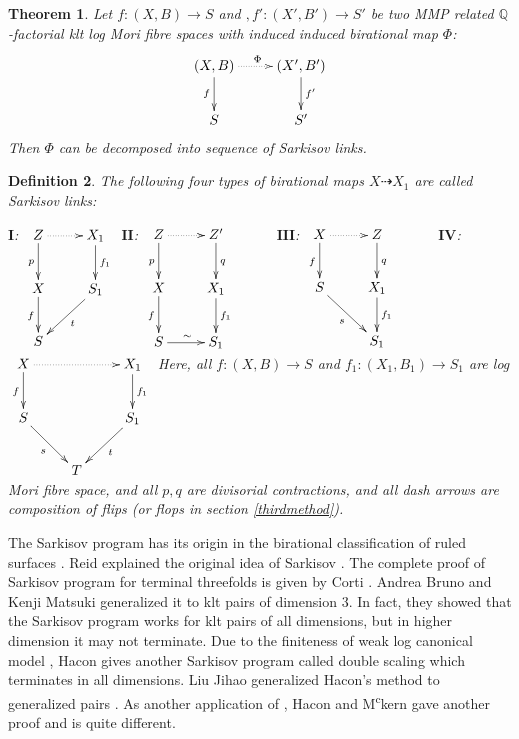 \documentclass{article}
\newtheorem{defn}{Definition}[subsection]
\newtheorem{thm}[defn]{Theorem}
\newtheorem{rmk}[defn]{Remark}
\begin{document}
\begin{thm}\label{main}
  Let $ f:(X,B)\to S$ and $,f':(X',B')\to S' $ be two MMP related $ \mathbb{Q} $-factorial klt log Mori fibre spaces with induced induced  birational map $\Phi$:
  \[ \xymatrix{
    (X,B)\ar[d]_f\ar@{.>}[r]^\Phi&(X',B')\ar[d]^{f'}\\
    S&S'} \]
  Then $ \Phi  $ can be decomposed into sequence of Sarkisov links.
  \end{thm}

\begin{defn}
  The following four types of  birational maps $X\dashrightarrow X_1$ are called Sarkisov links: 

  $\textbf{I}$:
  $\xymatrix{
    Z\ar[d]_p\ar@{.>}[r]&X_1\ar[d]^{f_1}\\
    X\ar[d]_f&S_1\ar[dl]^{t}\\
  S &}$
  $\textbf{II}$:
  $\xymatrix{
    Z\ar[d]_p\ar@{.>}[r]&Z'\ar[d]^{q}&\\
    X\ar[d]_{f}&X_1\ar[d]^{f_1}\\
    S\ar[r]^{\sim}&S_1}$
  $\textbf{III}$:
  $
  \xymatrix{
    X\ar@{.>}[r]\ar[d]_f& Z\ar[d]^q& \\
    S\ar[rd]_{s}         & X_{1}\ar[d]^{f_{1}}&\\
    &S_{1}
  }
  $
  $\textbf{IV}$:
  $\xymatrix{
    X\ar[d]_f\ar@{.>}[rr]&&X_1\ar[d]^{f_1}\\
    S\ar[dr]_{s}&&S_1\ar[dl]^{t}\\
    &T &}$
    Here, all $ f:(X,B)\to S $ and $ f_1:(X_1,B_1)\to S_1 $ are log Mori fibre space, and all $ p,q $ are divisorial contractions, and all dash arrows are composition of flips (or flops in section \ref{thirdmethod}). 
\end{defn}
The Sarkisov program has its origin in the birational classification of ruled surfaces \cite{sarkisovCONICBUNDLESTRUCTURES1983}. 
Reid explained the original idea of Sarkisov \cite{sarkisovBirationalmapsofstandardQfanoFibering}. 
The complete proof of Sarkisov program for terminal threefolds is given  by Corti \cite{cortiFactoringBirationalMaps}. 
Andrea Bruno and Kenji Matsuki \cite{brunoLogSarkisovProgram1995} generalized it to klt pairs of dimension $3$. In fact, they showed that the Sarkisov program works for klt pairs of all dimensions, but in higher dimension it may not terminate.  
Due to the finiteness of weak log canonical model \cite{birkarExistenceMinimalModels2009}, Hacon gives another Sarkisov program called double scaling \cite{haconMinimalModelProgram2012} which terminates in all dimensions. 
Liu Jihao generalized Hacon's method to generalized pairs \cite{liuSarkisovProgramGeneralized2021}. 
As another application of \cite{birkarExistenceMinimalModels2009}, Hacon and M\textsuperscript{c}kern gave another proof \cite{haconSarkisovProgram2012} and is quite different.
\end{document}
